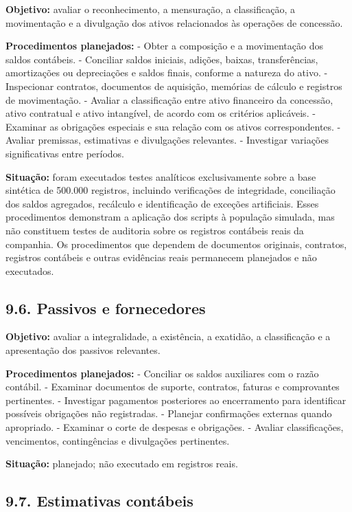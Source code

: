 \documentclass[
]{article}
\begin{document}
\textbf{Objetivo:} avaliar o reconhecimento, a mensuração, a
classificação, a movimentação e a divulgação dos ativos relacionados às
operações de concessão.

\textbf{Procedimentos planejados:} - Obter a composição e a movimentação
dos saldos contábeis. - Conciliar saldos iniciais, adições, baixas,
transferências, amortizações ou depreciações e saldos finais, conforme a
natureza do ativo. - Inspecionar contratos, documentos de aquisição,
memórias de cálculo e registros de movimentação. - Avaliar a
classificação entre ativo financeiro da concessão, ativo contratual e
ativo intangível, de acordo com os critérios aplicáveis. - Examinar as
obrigações especiais e sua relação com os ativos correspondentes. -
Avaliar premissas, estimativas e divulgações relevantes. - Investigar
variações significativas entre períodos.

\textbf{Situação:} foram executados testes analíticos exclusivamente
sobre a base sintética de 500.000 registros, incluindo verificações de
integridade, conciliação dos saldos agregados, recálculo e identificação
de exceções artificiais. Esses procedimentos demonstram a aplicação dos
scripts à população simulada, mas não constituem testes de auditoria
sobre os registros contábeis reais da companhia. Os procedimentos que
dependem de documentos originais, contratos, registros contábeis e
outras evidências reais permanecem planejados e não executados.

\subsection{9.6. Passivos e fornecedores}\label{passivos-e-fornecedores}

\textbf{Objetivo:} avaliar a integralidade, a existência, a exatidão, a
classificação e a apresentação dos passivos relevantes.

\textbf{Procedimentos planejados:} - Conciliar os saldos auxiliares com
o razão contábil. - Examinar documentos de suporte, contratos, faturas e
comprovantes pertinentes. - Investigar pagamentos posteriores ao
encerramento para identificar possíveis obrigações não registradas. -
Planejar confirmações externas quando apropriado. - Examinar o corte de
despesas e obrigações. - Avaliar classificações, vencimentos,
contingências e divulgações pertinentes.

\textbf{Situação:} planejado; não executado em registros reais.

\subsection{9.7. Estimativas contábeis}\label{estimativas-contuxe1beis}
\end{document}
